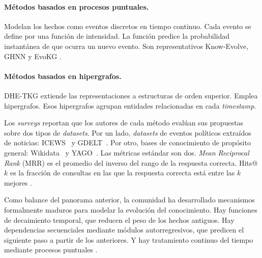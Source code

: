 \paragraph{Métodos basados en procesos puntuales.} Modelan los hechos como eventos discretos en tiempo continuo. Cada evento se define por una función de intensidad. La función predice la probabilidad instantánea de que ocurra un nuevo evento. Son representativos Know-Evolve, GHNN y EvoKG \cite{tkg_survey2024}.

\paragraph{Métodos basados en hipergrafos.} DHE-TKG \cite{dhe_tkg2024} extiende las representaciones a estructuras de orden superior. Emplea hipergrafos. Esos hipergrafos agrupan entidades relacionadas en cada \emph{timestamp}.

Los \emph{surveys} \cite{tkg_survey2024, tkgc_survey2023} reportan que los autores de cada método evalúan sus propuestas sobre dos tipos de \emph{datasets}. Por un lado, \emph{datasets} de eventos políticos extraídos de noticias: ICEWS~\cite{boschee2015icews} y GDELT~\cite{leetaru2013gdelt}. Por otro, bases de conocimiento de propósito general: Wikidata~\cite{vrandecic2014wikidata} y YAGO~\cite{suchanek2007yago}. Las métricas estándar son dos. \emph{Mean Reciprocal Rank} (MRR) \cite{manning2008ir} es el promedio del inverso del rango de la respuesta correcta. Hits@$k$ \cite{bordes2013translating} es la fracción de consultas en las que la respuesta correcta está entre las $k$ mejores \cite{tkg_survey2024, tkgc_survey2023}.

Como balance del panorama anterior, la comunidad ha desarrollado mecanismos formalmente maduros para modelar la evolución del conocimiento. Hay funciones de decaimiento temporal, que reducen el peso de los hechos antiguos. Hay dependencias secuenciales mediante módulos autorregresivos, que predicen el siguiente paso a partir de los anteriores. Y hay tratamiento continuo del tiempo mediante procesos puntuales \cite{tkg_survey2024, tkgc_survey2023}.

